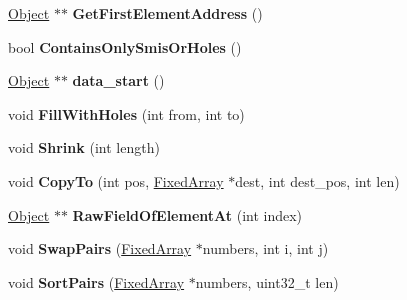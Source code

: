 \begin{DoxyCompactItemize}
\item 
\hypertarget{classv8_1_1internal_1_1_fixed_array_a764d034ed48aafab5f2652650539430c}{}\hyperlink{classv8_1_1internal_1_1_object}{Object} $\ast$$\ast$ {\bfseries Get\+First\+Element\+Address} ()\label{classv8_1_1internal_1_1_fixed_array_a764d034ed48aafab5f2652650539430c}

\item 
\hypertarget{classv8_1_1internal_1_1_fixed_array_a22676358d865881a11d55fdcc2cb8a8d}{}bool {\bfseries Contains\+Only\+Smis\+Or\+Holes} ()\label{classv8_1_1internal_1_1_fixed_array_a22676358d865881a11d55fdcc2cb8a8d}

\item 
\hypertarget{classv8_1_1internal_1_1_fixed_array_a58637e5c3f9578918deeb899b6976734}{}\hyperlink{classv8_1_1internal_1_1_object}{Object} $\ast$$\ast$ {\bfseries data\+\_\+start} ()\label{classv8_1_1internal_1_1_fixed_array_a58637e5c3f9578918deeb899b6976734}

\item 
\hypertarget{classv8_1_1internal_1_1_fixed_array_aad3f35474e49dd5143b5f2334926ce33}{}void {\bfseries Fill\+With\+Holes} (int from, int to)\label{classv8_1_1internal_1_1_fixed_array_aad3f35474e49dd5143b5f2334926ce33}

\item 
\hypertarget{classv8_1_1internal_1_1_fixed_array_a0365d2e06f63bcfe4acaace5b0eca1a0}{}void {\bfseries Shrink} (int length)\label{classv8_1_1internal_1_1_fixed_array_a0365d2e06f63bcfe4acaace5b0eca1a0}

\item 
\hypertarget{classv8_1_1internal_1_1_fixed_array_a946fb06002793ff6e12c78f207f4b2a5}{}void {\bfseries Copy\+To} (int pos, \hyperlink{classv8_1_1internal_1_1_fixed_array}{Fixed\+Array} $\ast$dest, int dest\+\_\+pos, int len)\label{classv8_1_1internal_1_1_fixed_array_a946fb06002793ff6e12c78f207f4b2a5}

\item 
\hypertarget{classv8_1_1internal_1_1_fixed_array_a0d5ff78618607209005accae447ff629}{}\hyperlink{classv8_1_1internal_1_1_object}{Object} $\ast$$\ast$ {\bfseries Raw\+Field\+Of\+Element\+At} (int index)\label{classv8_1_1internal_1_1_fixed_array_a0d5ff78618607209005accae447ff629}

\item 
\hypertarget{classv8_1_1internal_1_1_fixed_array_a1aeb180f8d130d58f4dd67bb65a0d1bb}{}void {\bfseries Swap\+Pairs} (\hyperlink{classv8_1_1internal_1_1_fixed_array}{Fixed\+Array} $\ast$numbers, int i, int j)\label{classv8_1_1internal_1_1_fixed_array_a1aeb180f8d130d58f4dd67bb65a0d1bb}

\item 
\hypertarget{classv8_1_1internal_1_1_fixed_array_a2ac505844e9cd989edc007b75dca925e}{}void {\bfseries Sort\+Pairs} (\hyperlink{classv8_1_1internal_1_1_fixed_array}{Fixed\+Array} $\ast$numbers, uint32\+\_\+t len)\label{classv8_1_1internal_1_1_fixed_array_a2ac505844e9cd989edc007b75dca925e}

\end{DoxyCompactItemize}
